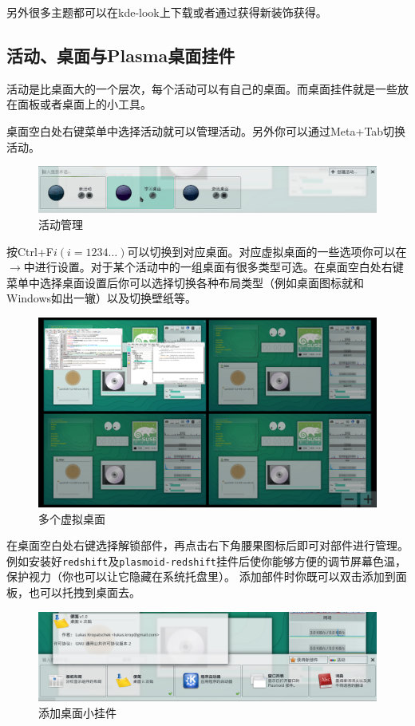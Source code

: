\documentclass[11pt,openany]{book}
\newcommand{\soft}[1]{\texttt{\textcolor{dgreen}{#1}}}
\newcommand{\menu}[1]{\fbox{#1}}
\newcommand{\me}{$\rightarrow$}
\begin{document}
另外很多主题都可以在kde-look上下载或者通过获得新装饰获得。
\subsection{活动、桌面与Plasma桌面挂件}
活动是比桌面大的一个层次，每个活动可以有自己的桌面。而桌面挂件就是一些放在面板或者桌面上的小工具。

桌面空白处右键菜单中选择活动就可以管理活动。另外你可以通过Meta+Tab切换活动。
\begin{figure}[htbp!]
\centering
\includegraphics[width=\textwidth]{./pic/activity.png} 
\caption{活动管理}\label{activity}
\end{figure}

按Ctrl+F$i(i=1234\ldots)$可以切换到对应桌面。对应虚拟桌面的一些选项你可以在\menu{工作空间行为}\me\menu{虚拟桌面}中进行设置。对于某个活动中的一组桌面有很多类型可选。在桌面空白处右键菜单中选择桌面设置后你可以选择切换各种布局类型（例如桌面图标就和Windows如出一辙）以及切换壁纸等。
\begin{figure}[htbp!]
\centering
\includegraphics[width=\textwidth]{./pic/virtualdesk.png} 
\caption{多个虚拟桌面}\label{multidesk}
\end{figure}

在桌面空白处右键选择解锁部件，再点击右下角腰果图标后即可对部件进行管理。例如安装好\soft{redshift}及\soft{plasmoid-redshift}挂件后使你能够方便的调节屏幕色温，保护视力（你也可以让它隐藏在系统托盘里）。
添加部件时你既可以双击添加到面板，也可以托拽到桌面去。
\begin{figure}[htbp!]
\centering
\includegraphics[width=\textwidth]{./pic/plasma.png} 
\caption{添加桌面小挂件}\label{plasma}
\end{figure}
\end{document}
